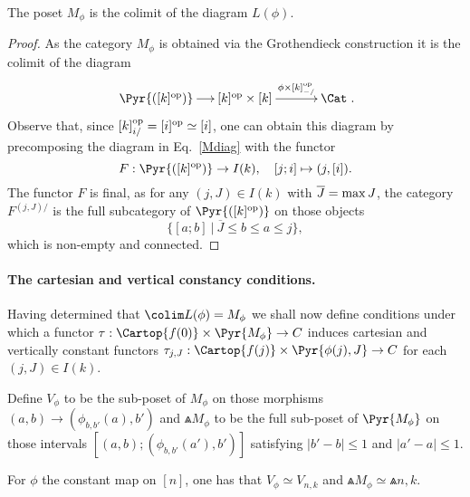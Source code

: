 \documentclass[a4paper]{article}
\numberwithin{equation}{section}
\begin{document}
\begin{lem}
\label{Mlem}
 The poset $M_\phi$ is the colimit of the diagram $L(\phi)$.
\end{lem}
\begin{proof}
 As the category $M_\phi$ is obtained via the Grothendieck construction it is the colimit of the diagram
 \begin{equation*}
  \xymatrixcolsep{1.1pc}\xymatrix{ \Pyr{([k]^{\rm op})} \ar[r] & [k]^{\rm op} \times [k] \ar[rr]^-{\phi \times [k]^{\rm op}_{-/}}&  & \Cat}. 
 \end{equation*}
 Observe that, since $[k]^{\rm op}_{i/} = [i]^{\rm op} \simeq [i]$, one can obtain this diagram by precomposing the diagram in Eq.~\ref{Mdiag} with the functor
 \begin{equation*}
  F: \Pyr{([k]^{\rm op})} \to I(k), \quad [j;i] \mapsto (j,[i]). 
 \end{equation*}
The functor $F$ is final, as for any $(j,J) \in I(k)$ with $\overline{J} = {\rm max} \, J$, the category $F^{(j,J)/}$ is the full subcategory of $\Pyr{([k]^{\rm op})}$ on those objects
\begin{equation*}
 \{[a;b] \ | \ \overline{J} \leq b \leq a \leq j\},
\end{equation*}
which is non-empty and connected.
\end{proof}


\paragraph{The cartesian and vertical constancy conditions.} Having determined that $\colim L(\phi) = M_\phi$ we shall now define conditions under which a functor $\tau: \Cartop{f(0)}\times\Pyr{M_\phi} \to C$ induces cartesian and vertically constant functors $\tau_{j,J}: \Cartop{f(j)} \times \Pyr{\phi(j),J} \to C$ for each $(j,J) \in I(k)$.

\begin{defn}
 Define $V_\phi$ to be the sub-poset of $M_\phi$ on those morphisms $(a,b) \to (\phi_{b,b'}(a),b')$ and $\Wedge {M_\phi}$ to be the full sub-poset of $\Pyr {M_\phi}$ on those intervals $[(a,b);(\phi_{b,b'}(a'),b')]$ satisfying $|b'-b| \leq 1$ and $|a'-a| \leq 1$.
\end{defn}


\begin{exam}
 For $\phi$ the constant map on $[n]$, one has that $V_\phi\simeq V_{n,k}$ and $\Wedge{M_\phi} \simeq \Wedge {n,k}$.
 \end{exam}
 
\end{document}
